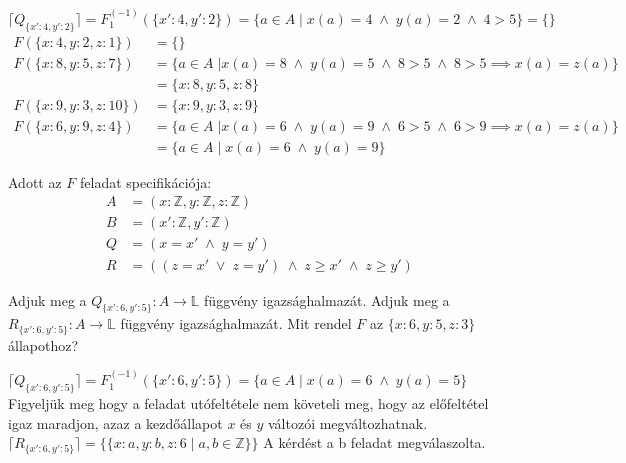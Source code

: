 \documentclass[a4paper,12pt]{article}
\theoremstyle{definition}
\begin{document}
\begin{solution}
\begin{figure}[H]
\begin{tikzpicture}[x=0.75pt,y=0.75pt,yscale=-1,xscale=1]
            \end{tikzpicture}

        \end{figure}
        \begin{tasks}
            \task $ \lceil Q_{\{x':4,y':2\}} \rceil = F_1^{(-1)}(\{x':4,y':2\}) = \{ a \in A \; | \; x(a) = 4 \; \land \; y(a) = 2 \; \land \; 4>5 \} = \{\} $
            \task
            \begin{align*}
                F(\{ x:4,y:2,z:1 \}) &= \{\} \\
                F(\{ x:8,y:5,z:7 \}) &= \{a \in A \; | x(a) = 8 \; \land \; y(a) = 5 \; \land \; 8 > 5 \; \land \; 8 > 5 \implies x(a) = z(a) \} \\ &= {\{x:8,y:5,z:8}\} \\
                F(\{ x:9,y:3,z:10 \}) &= {\{x:9,y:3,z:9}\} \\
                F(\{ x:6,y:9,z:4 \}) &= \{a \in A \; | x(a) = 6 \; \land \; y(a) = 9 \; \land \; 6 > 5 \; \land \; 6 > 9 \implies x(a) = z(a) \} \\ &= {\{a \in A \; | \; x(a) = 6 \; \land \; y(a) = 9 \}}
            \end{align*}
        \end{tasks}
    \end{solution}
    \setcounter{question}{1}
    \begin{question}
        Adott az $F$ feladat specifikációja:
        \begin{align*}
            A &= (x: \mathbb{Z}, y: \mathbb{Z}, z: \mathbb{Z}) \\
            B &= (x': \mathbb{Z}, y': \mathbb{Z}) \\
            Q &= (x = x' \; \land \; y = y') \\
            R &= ((z = x' \; \lor \; z = y') \; \land \; z \ge x' \; \land \; z \ge y')
        \end{align*}
        \begin{tasks}
            \task Adjuk meg a $ Q_{\{x':6,y':5\}}: A \rightarrow \mathbb{L} $ függvény igazsághalmazát.
            \task Adjuk meg a $ R_{\{x':6,y':5\}}: A \rightarrow \mathbb{L} $ függvény igazsághalmazát.
            \task Mit rendel $F$ az $ {\{x:6,y:5, z:3\}} $ állapothoz?
        \end{tasks}
    \end{question}
    \begin{solution}
        \begin{tasks}
            \task $ \lceil Q_{\{x':6,y':5\}} \rceil = F_1^{(-1)}(\{x':6,y':5\}) = \{ a \in A \; | \; x(a) = 6 \; \land \; y(a) = 5 \} $
            \task Figyeljük meg hogy a feladat utófeltétele nem követeli meg, hogy az előfeltétel igaz maradjon,
            azaz a kezdőállapot $x$ és $y$ változói megváltozhatnak. \\
            $ \lceil R_{\{x':6,y':5\}} \rceil = \{\{x:a,y:b,z:6 \; | \; a,b \in \mathbb{Z}\}\} $
            \task A kérdést a b feladat megválaszolta.
        \end{tasks}
    \end{solution}
\end{document}
